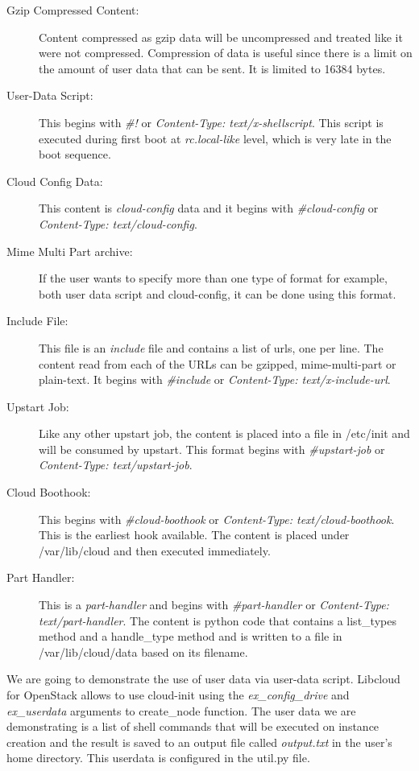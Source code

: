 \begin{description}
   \item[Gzip Compressed Content:] Content compressed as gzip data will be
   uncompressed and treated like it were not compressed. Compression of data 
   is useful since there is a limit on the amount of user data that can be 
   sent. It is limited to 16384 bytes. 
   \item[User-Data Script:] This begins with \textit{\#!} or
   \textit{Content-Type: text/x-shellscript}. This script is executed during 
   first boot at \textit{rc.local-like} level, which is very late in the boot 
   sequence. 
   \item[Cloud Config Data:] This content is \textit{cloud-config} data and it
   begins with \textit{\#cloud-config} or 
   \textit{Content-Type: text/cloud-config}. 
   \item[Mime Multi Part archive:] If the user wants to specify more than one
   type of format for example, both user data script and cloud-config, it can 
   be done using this format. 
   \item[Include File:] This file is an \textit{include} file and contains a
   list of urls, one per line. The content read from each of the URLs can be
   gzipped, mime-multi-part or plain-text. It begins with \textit{\#include} or
   \textit{Content-Type: text/x-include-url}. 
   \item[Upstart Job:] Like any other upstart job, the content is placed into a
   file in /etc/init and will be consumed by upstart. This format begins with
   \textit{\#upstart-job} or \textit{Content-Type: text/upstart-job}. 
   \item[Cloud Boothook:] This begins with \textit{\#cloud-boothook} or
   \textit{Content-Type: text/cloud-boothook}. This is the earliest hook 
   available. The content is placed under /var/lib/cloud and then executed 
   immediately. 
   \item[Part Handler:] This is a \textit{part-handler} and begins with
   \textit{\#part-handler} or \textit{Content-Type: text/part-handler}. The 
   content is python code that contains a list\_types method and a 
   handle\_type method and is written to a file in /var/lib/cloud/data 
   based on its filename. 
\end{description}

We are going to demonstrate the use of user data via user-data script. 
Libcloud for OpenStack allows to use cloud-init using the 
\textit{ex\_config\_drive} and \textit{ex\_userdata} arguments to 
create\_node function. The user data we are demonstrating is a list of 
shell commands that will be executed on instance creation and the result 
is saved to an output file called \textit{output.txt} in the user's home 
directory. This userdata is configured in the util.py file.


